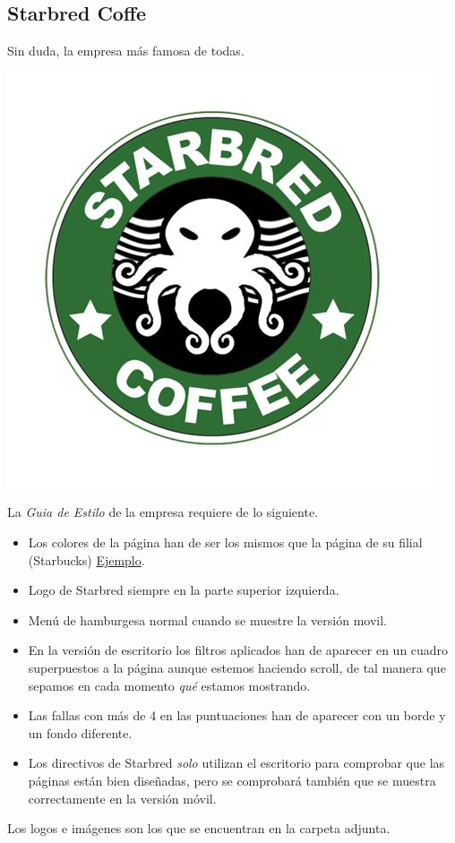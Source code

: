 \documentclass[a4paper,10pt]{article}
\begin{document}
\subsection{ Starbred Coffe }

Sin duda, la empresa más famosa de todas. 

\includegraphics[width=\textwidth]{imgs/cthulhu}

La \textit{Guia de Estilo} de la empresa requiere de lo siguiente.

\begin{itemize}

\item Los colores de la página han de ser los mismos que la página de su filial (Starbucks) \href{https://www.starbucks.es/coffee}{Ejemplo}.
\item Logo de Starbred siempre en la parte superior izquierda.
\item Menú de hamburgesa normal cuando se muestre la versión movil.
\item En la versión de escritorio los filtros aplicados han de aparecer en un cuadro superpuestos a la página aunque estemos haciendo scroll, de tal manera que sepamos en cada momento \textit{qué} estamos mostrando.
\item Las fallas con más de 4 en las puntuaciones han de aparecer con un borde y un fondo diferente.
\item Los directivos de Starbred \textit{solo} utilizan el escritorio para comprobar que las páginas están bien diseñadas, pero se comprobará también que se muestra correctamente en la versión móvil.
  
\end{itemize}



Los logos e imágenes son los que se encuentran en la carpeta adjunta.
\end{document}
